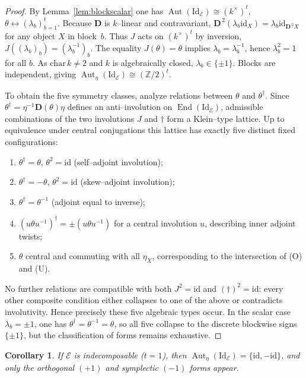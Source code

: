 \documentclass[12pt]{article}
\DeclareMathOperator{\Aut}{Aut}
\newcommand{\Id}{\mathrm{Id}}
\newcommand{\E}{\mathcal{E}}
\newcommand{\End}{\operatorname{End}}
\newcommand{\id}{\mathrm{id}}
\theoremstyle{plain}
\newtheorem{corollary}[theorem]{Corollary}
\theoremstyle{definition}
\theoremstyle{remark}
\numberwithin{equation}{section}
\begin{document}
\begin{proof}
By Lemma~\ref{lem:blockscalar} one has $\Aut(\Id_\E)\cong(k^\times)^t$, $\theta\leftrightarrow(\lambda_b)_{b=1}^t$.  
Because $\mathbf D$ is $k$–linear and contravariant, $\mathbf D^{\,2}(\lambda_b\id_X)=\lambda_b\id_{\mathbf D^{\,2}X}$ for any object $X$ in block~$b$.  
Thus $J$ acts on $(k^\times)^t$ by inversion, $J((\lambda_b)_b)=(\lambda_b^{-1})_b$.  
The equality $J(\theta)=\theta$ implies $\lambda_b=\lambda_b^{-1}$, hence $\lambda_b^2=1$ for all $b$.  
As $\mathrm{char}\,k\neq2$ and $k$ is algebraically closed, $\lambda_b\in\{\pm1\}$.  
Blocks are independent, giving $\Aut_\eta(\Id_\E)\cong(\mathbb Z/2)^t$.

To obtain the five symmetry classes, analyze relations between $\theta$ and $\theta^{\dagger}$.  
Since $\theta^{\dagger}=\eta^{-1}\mathbf D(\theta)\eta$ defines an anti–involution on $\End(\Id_\E)$, admissible combinations of the two involutions $J$ and $\dagger$ form a Klein–type lattice.  
Up to equivalence under central conjugations this lattice has exactly five distinct fixed configurations:
\begin{enumerate}
\item[(O)] $\theta^{\dagger}=\theta$, $\theta^2=\id$ (self–adjoint involution);
\item[(Sp)] $\theta^{\dagger}=-\theta$, $\theta^2=\id$ (skew–adjoint involution);
\item[(U)] $\theta^{\dagger}=\theta^{-1}$ (adjoint equal to inverse);
\item[(T)] $(u\theta u^{-1})^{\dagger}=\pm(u\theta u^{-1})$ for a central involution $u$, describing inner adjoint twists;
\item[(N)] $\theta$ central and commuting with all $\eta_X$, corresponding to the intersection of (O) and (U).
\end{enumerate}
No further relations are compatible with both $J^2=\id$ and $(\dagger)^2=\id$: every other composite condition either collapses to one of the above or contradicts involutivity.  
Hence precisely these five algebraic types occur.  
In the scalar case $\lambda_b=\pm1$, one has $\theta^{\dagger}=\theta^{-1}=\theta$, so all five collapse to the discrete blockwise signs $\{\pm1\}$, but the classification of forms remains exhaustive.
\end{proof}

\begin{corollary}
If $\E$ is indecomposable ($t=1$), then $\Aut_\eta(\Id_\E)=\{\id,-\id\}$, and only the orthogonal $(+1)$ and symplectic $(-1)$ forms appear.
\end{corollary}
\end{document}

